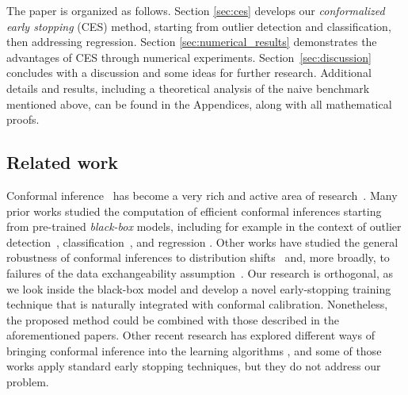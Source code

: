 The paper is organized as follows. Section \ref{sec:ces} develops our {\em conformalized early stopping} (CES) method, starting from outlier detection and classification, then addressing regression. Section \ref{sec:numerical_results} demonstrates the advantages of CES through numerical experiments. Section~\ref{sec:discussion} concludes with a discussion and some ideas for further research.
Additional details and results, including a theoretical analysis of the naive benchmark mentioned above, can be found in the Appendices, along with all mathematical proofs.

\subsection*{Related work}

Conformal inference~\citep{saunders1999transduction,vovk1999machine,vovk2005algorithmic} has become a very rich and active area of research~\cite{lei2013distribution,lei2014distribution,lei2018distribution,barber2019predictive}.
Many prior works studied the computation of efficient conformal inferences starting from pre-trained {\em black-box} models, including for example in the context of outlier detection~\cite{smith2015conformal,guan2019prediction,bates2021testing,Liang_2022_integrative_p_val}, classification~\cite{vovk2003mondrian,hechtlinger2018cautious,romano2020classification,angelopoulos2020uncertainty,bates2021distributionfree}, and regression \cite{vovk2005algorithmic,lei2014distribution,romano2019conformalized}.
Other works have studied the general robustness of conformal inferences to distribution shifts~\cite{tibshirani2019conformal,sesia2022conformal} and, more broadly, to failures of the data exchangeability assumption~\cite{barber2022conformal,gibbs2022conformal}.
Our research is orthogonal, as we look inside the black-box model and develop a novel early-stopping training technique that is naturally integrated with conformal calibration. Nonetheless, the proposed method could be combined with those described in the aforementioned papers.
Other recent research has explored different ways of bringing conformal inference into the learning algorithms \cite{colombo2020training,bellotti2021optimized,stutz2021learning,einbinder2022training}, and some of those works apply standard early stopping techniques, but they do not address our problem.

